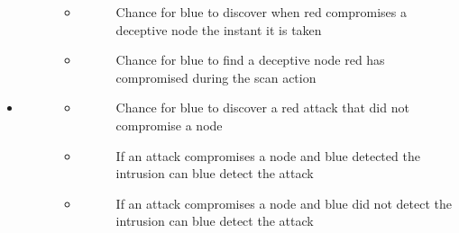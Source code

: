 \documentclass[letterpaper,10pt,english]{sphinxmanual}
\begin{document}
\begin{itemize}
\begin{description}
\begin{itemize}
\begin{description}
\end{description}

\item {} \begin{description}
\item[{}] \leavevmode
\sphinxAtStartPar
Chance for blue to discover when red compromises a deceptive node the instant it is taken

\end{description}

\item {} \begin{description}
\item[{}] \leavevmode
\sphinxAtStartPar
Chance for blue to find a deceptive node red has compromised during the scan action

\end{description}

\end{itemize}

\end{description}

\item {} \begin{description}
\item[{}] \leavevmode\begin{itemize}
\item {} \begin{description}
\item[{}] \leavevmode
\sphinxAtStartPar
Chance for blue to discover a red attack that did not compromise a node

\end{description}

\item {} \begin{description}
\item[{}] \leavevmode
\sphinxAtStartPar
If an attack compromises a node and blue detected the intrusion can blue detect the attack

\end{description}

\item {} \begin{description}
\item[{}] \leavevmode
\sphinxAtStartPar
If an attack compromises a node and blue did not detect the intrusion can blue detect the attack


\end{description}
\end{itemize}
\end{description}
\end{itemize}
\end{document}
